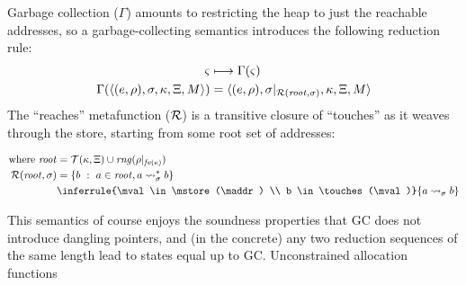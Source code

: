 \begin{SCodeFlow}
\begin{RktBlk}
\begin{SingleColumn}
\mbox{}\RktPn{(}\mbox{}\RktPn{(}\RktPn{[}\RktSym{$\mkont$}\mbox{}\RktPn{(}\mbox{}\RktPn{(}\mbox{}\RktSym{$\mktab$}\mbox{}\RktPn{)}\RktPn{)}\RktPn{]}\RktPn{)}

\mbox{}\RktPn{(}\mbox{}\RktSym{$\mkont$}\RktPn{)}\RktPn{)}\RktPn{]}\RktPn{)}\RktPn{]}\RktPn{)}\RktPn{)}\RktPn{)}\end{SingleColumn}\end{RktBlk}\end{SCodeFlow}

Garbage collection ($\Gamma$) amounts to restricting the heap to just the reachable addresses, so a garbage-collecting semantics introduces the following reduction rule:
\begin{align*}
  \varsigma &\longmapsto \Gamma(\varsigma) \\
  \Gamma(\langle (e,\rho),\sigma,\kappa, \Xi, M \rangle) &= \langle (e,\rho),\sigma|_{{\mathcal R}(\mathit{root}, \sigma)}, \kappa, \Xi, M \rangle \\
\end{align*}
%
The ``reaches'' metafunction (${\mathcal R}$) is a transitive closure of ``touches'' as it weaves through the store, starting from some root set of addresses:

\begin{align*}
  \text{where } \mathit{root} &= \touches(\mkont,\mktab) \cup \mathit{rng}(\menv|_{\mathit{fv}(\mexpr)}) \\
  \reaches(\mathit{root}, \mstore) &= \setbuild{b}{\maddr \in \mathit{root}, \maddr \rightsquigarrow_\mstore^* b} \\
   &
               \inferrule{\mval \in \mstore(\maddr) \\
                             b \in \touches(\mval)}
                            {\maddr \rightsquigarrow_\mstore b}
\end{align*}

This semantics of course enjoys the soundness properties that GC does not introduce dangling pointers, and (in the concrete) any two reduction sequences of the same length lead to states equal up to GC.
%
Unconstrained allocation functions

